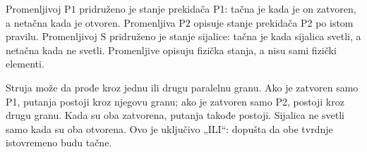 
Promenljivoj \(\mathrm{P1}\) pridruženo je stanje prekidača P1: tačna je kada je on zatvoren, a netačna kada je otvoren. Promenljiva \(\mathrm{P2}\) opisuje stanje prekidača P2 po istom pravilu. Promenljivoj \(\mathrm{S}\) pridruženo je stanje sijalice: tačna je kada sijalica svetli, a netačna kada ne svetli. Promenljive opisuju fizička stanja, a nisu sami fizički elementi.

Struja može da prođe kroz jednu ili drugu paralelnu granu. Ako je zatvoren samo P1, putanja postoji kroz njegovu granu; ako je zatvoren samo P2, postoji kroz drugu granu. Kada su oba zatvorena, putanja takođe postoji. Sijalica ne svetli samo kada su oba otvorena. Ovo je uključivo „ILI“: dopušta da obe tvrdnje istovremeno budu tačne.
